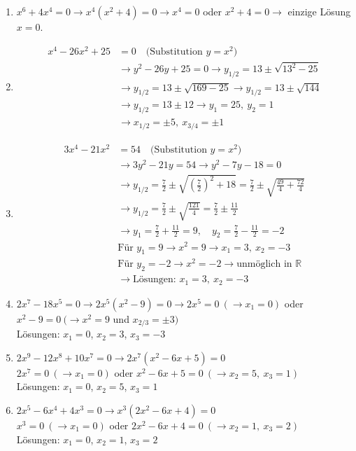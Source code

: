 \begin{enumerate}[label=\alph*)]
  \item $x^6 + 4x^4 = 0 \rightarrow x^4(x^2 + 4) = 0 \rightarrow x^4 = 0$ oder $x^2 + 4 = 0 \rightarrow$ einzige Lösung $x = 0$.
  \item \begin{align*}
      x^4 - 26x^2 + 25 &= 0 \quad \text{(Substitution } y = x^2\text{)}\\
      &\rightarrow y^2 - 26y + 25 = 0 \rightarrow y_{1/2} = 13 \pm \sqrt{13^2 - 25}\\
      &\rightarrow y_{1/2} = 13 \pm \sqrt{169 - 25} \rightarrow y_{1/2} = 13 \pm \sqrt{144}\\
      &\rightarrow y_{1/2} = 13 \pm 12 \rightarrow y_1 = 25,\ y_2 = 1\\
      &\rightarrow x_{1/2} = \pm 5,\ x_{3/4} = \pm 1
    \end{align*}
  \item \begin{align*}
      3x^4 - 21x^2 &= 54 \quad \text{(Substitution } y = x^2\text{)}\\
      &\rightarrow 3y^2 - 21y = 54 \rightarrow y^2 - 7y - 18 = 0\\
      &\rightarrow y_{1/2} = \frac{7}{2} \pm \sqrt{\left(\frac{7}{2}\right)^2 + 18} = \frac{7}{2} \pm \sqrt{\frac{49}{4} + \frac{72}{4}}\\
      &\rightarrow y_{1/2} = \frac{7}{2} \pm \sqrt{\frac{121}{4}} = \frac{7}{2} \pm \frac{11}{2}\\
      &\rightarrow y_1 = \frac{7}{2} + \frac{11}{2} = 9,\quad y_2 = \frac{7}{2} - \frac{11}{2} = -2\\
      &\text{Für } y_1 = 9 \rightarrow x^2 = 9 \rightarrow x_1 = 3,\ x_2 = -3\\
      &\text{Für } y_2 = -2 \rightarrow x^2 = -2 \rightarrow \text{unmöglich in } \mathbb{R}\\
      &\rightarrow \text{Lösungen: } x_1 = 3,\ x_2 = -3
    \end{align*}
  \item $2x^7 - 18x^5 = 0 \rightarrow 2x^5(x^2 - 9) = 0 \rightarrow 2x^5 = 0 \ (\rightarrow x_1 = 0)$ oder $x^2 - 9 = 0 \ (\rightarrow x^2 = 9$ und $x_{2/3} = \pm 3)$\\
    Lösungen: $x_1 = 0$, $x_2 = 3$, $x_3 = -3$
  \item $2x^9 - 12x^8 + 10x^7 = 0 \rightarrow 2x^7(x^2 - 6x + 5) = 0$\\
    $2x^7 = 0 \ (\rightarrow x_1 = 0)$ oder $x^2 - 6x + 5 = 0 \ (\rightarrow x_2 = 5,\ x_3 = 1)$\\
    Lösungen: $x_1 = 0$, $x_2 = 5$, $x_3 = 1$
  \item $2x^5 - 6x^4 + 4x^3 = 0 \rightarrow x^3(2x^2 - 6x + 4) = 0$\\
    $x^3 = 0 \ (\rightarrow x_1 = 0)$ oder $2x^2 - 6x + 4 = 0 \ (\rightarrow x_2 = 1,\ x_3 = 2)$\\
    Lösungen: $x_1 = 0$, $x_2 = 1$, $x_3 = 2$
\end{enumerate}

